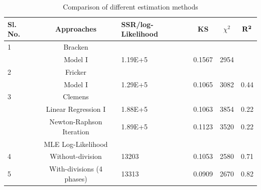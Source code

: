 \documentclass[]{article}
\begin{document}
\begin{table}
\tiny
\caption{Comparison of different estimation methods}

{\begin{tabular}{|p{.1cm}|c|p{.8cm}|c|c|c|}   \hline\hline
\bf{Sl. No.} & \bf{Approaches} &	\bf{SSR/log-Likelihood}	& \bf{KS} & \bf{$\chi^2$} & $\bf{R^2}$  \\
\hline
\hline
1&Bracken\autocite{Bracken:1995}& & & &  \\
\hline
&Model I&1.19E+5&0.1567&2954&\\
\hline
2&Fricker\autocite{Fricker:1998}& & & &  \\
\hline
&Model I&1.29E+5&0.1065&3082&0.44\\
\hline
3&Clemens\autocite{Clemens:1997}& & & &  \\
\hline
&Linear Regression I&1.88E+5&0.1063&3854&0.22\\
\hline
&Newton-Raphson Iteration&1.89E+5&0.1123&3520&0.22\\
\hline
&MLE Log-Likelihood \autocite{Das:2007}& & & &  \\
\hline
4&Without-division&13203&0.1053&2580&0.71\\
\hline
5&With-divisions (4 phases)&13313&0.0909&2670&0.82\\
\hline
\hline
\end{tabular}}
\end{table}
\end{document}
